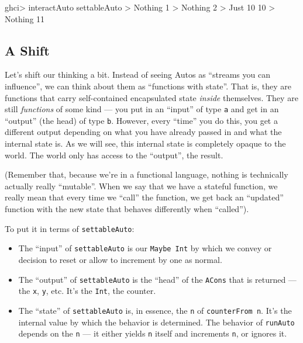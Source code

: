\documentclass[]{article}
\newenvironment{Shaded}{}{}
\newcommand{\DataTypeTok}[1]{\textcolor[rgb]{0.56,0.13,0.00}{#1}}
\newcommand{\DecValTok}[1]{\textcolor[rgb]{0.25,0.63,0.44}{#1}}
\newcommand{\NormalTok}[1]{#1}
\newcommand{\OperatorTok}[1]{\textcolor[rgb]{0.40,0.40,0.40}{#1}}
\begin{document}
\begin{Shaded}
\begin{Highlighting}[]
\NormalTok{ghci}\OperatorTok{\textgreater{}}\NormalTok{ interactAuto settableAuto}
\OperatorTok{\textgreater{}} \DataTypeTok{Nothing}
\DecValTok{1}
\OperatorTok{\textgreater{}} \DataTypeTok{Nothing}
\DecValTok{2}
\OperatorTok{\textgreater{}} \DataTypeTok{Just} \DecValTok{10}
\DecValTok{10}
\OperatorTok{\textgreater{}} \DataTypeTok{Nothing}
\DecValTok{11}
\end{Highlighting}
\end{Shaded}

\subsection{A Shift}\label{a-shift}

Let's shift our thinking a bit. Instead of seeing Autos as ``streams you can
influence'', we can think about them as ``functions with state''. That is, they
are functions that carry self-contained encapsulated state \emph{inside}
themselves. They are still \emph{functions} of some kind --- you put in an
``input'' of type \texttt{a} and get in an ``output'' (the head) of type
\texttt{b}. However, every ``time'' you do this, you get a different output
depending on what you have already passed in and what the internal state is. As
we will see, this internal state is completely opaque to the world. The world
only has access to the ``output'', the result.

(Remember that, because we're in a functional language, nothing is technically
actually really ``mutable''. When we say that we have a stateful function, we
really mean that every time we ``call'' the function, we get back an ``updated''
function with the new state that behaves differently when ``called'').

To put it in terms of \texttt{settableAuto}:

\begin{itemize}
\tightlist
\item
  The ``input'' of \texttt{settableAuto} is our \texttt{Maybe\ Int} by which we
  convey or decision to reset or allow to increment by one as normal.
\item
  The ``output'' of \texttt{settableAuto} is the ``head'' of the \texttt{ACons}
  that is returned --- the \texttt{x}, \texttt{y}, etc. It's the \texttt{Int},
  the counter.
\item
  The ``state'' of \texttt{settableAuto} is, in essence, the \texttt{n} of
  \texttt{counterFrom\ n}. It's the internal value by which the behavior is
  determined. The behavior of \texttt{runAuto} depends on the \texttt{n} --- it
  either yields \texttt{n} itself and increments \texttt{n}, or ignores it.
\end{itemize}
\end{document}
